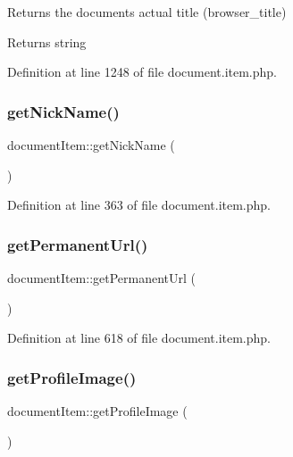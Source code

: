 Returns the document\textquotesingle{}s actual title (browser\+\_\+title) \begin{DoxyReturn}{Returns}
string 
\end{DoxyReturn}


Definition at line 1248 of file document.\+item.\+php.

\hypertarget{classdocumentItem_ab91ca9e1defb1a570212baa4f380706a}{}\label{classdocumentItem_ab91ca9e1defb1a570212baa4f380706a} 
\subsubsection{\texorpdfstring{get\+Nick\+Name()}{getNickName()}}
{\footnotesize\ttfamily document\+Item\+::get\+Nick\+Name (\begin{DoxyParamCaption}{ }\end{DoxyParamCaption})}



Definition at line 363 of file document.\+item.\+php.

\hypertarget{classdocumentItem_a8583e18888f4ad634ec23c7cd85dc172}{}\label{classdocumentItem_a8583e18888f4ad634ec23c7cd85dc172} 
\subsubsection{\texorpdfstring{get\+Permanent\+Url()}{getPermanentUrl()}}
{\footnotesize\ttfamily document\+Item\+::get\+Permanent\+Url (\begin{DoxyParamCaption}{ }\end{DoxyParamCaption})}



Definition at line 618 of file document.\+item.\+php.

\hypertarget{classdocumentItem_afb95c0b0d6d9106c737d8eeb51a3c834}{}\label{classdocumentItem_afb95c0b0d6d9106c737d8eeb51a3c834} 
\subsubsection{\texorpdfstring{get\+Profile\+Image()}{getProfileImage()}}
{\footnotesize\ttfamily document\+Item\+::get\+Profile\+Image (\begin{DoxyParamCaption}{ }\end{DoxyParamCaption})}

